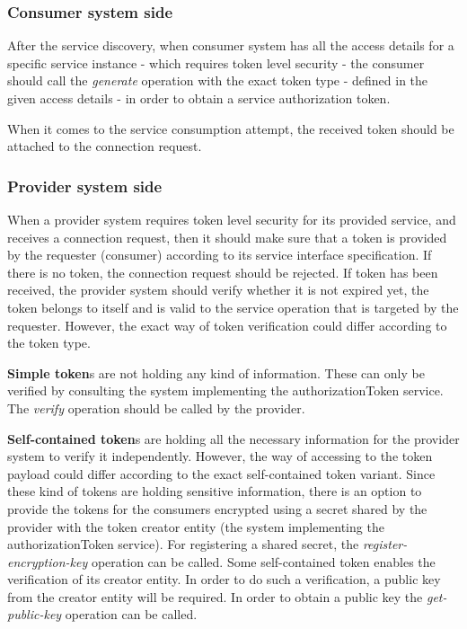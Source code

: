 \documentclass[a4paper]{arrowhead}
\begin{document}
\subsubsection{Consumer system side} 

After the service discovery, when consumer system has all the access details for a specific service instance  - which requires token level security - the consumer should call the \textit{generate} operation with the exact token type - defined in the given access details - in order to obtain a service authorization token. 

When it comes to the service consumption attempt, the received token should be attached to the connection request. 

\subsubsection{Provider system side}

When a provider system requires token level security for its provided service, and receives a connection request, then it should make sure that a token is provided by the requester (consumer) according to its service interface specification. If there is no token, the connection request should be rejected. If token has been received, the provider system should verify whether it is not expired yet, the token belongs to itself and is valid to the service operation that is targeted by the requester. However, the exact way of token verification could differ according to the token type.

\textbf{Simple token}s are not holding any kind of information. These can only be verified by consulting the system implementing the authorizationToken service. The \textit{verify} operation should be called by the provider.

\textbf{Self-contained token}s are holding all the necessary information for the provider system to verify it independently. However, the way of accessing to the token payload could differ according to the exact self-contained token variant. Since these kind of tokens are holding sensitive information, there is an option to provide the tokens for the consumers encrypted using a secret shared by the provider with the token creator entity (the system implementing the authorizationToken service). For registering a shared secret, the \textit{register-encryption-key} operation can be called. Some self-contained token enables the verification of its creator entity. In order to do such a verification, a public key from the creator entity will be required. In order to obtain a public key the \textit{get-public-key} operation can be called.
\end{document}
